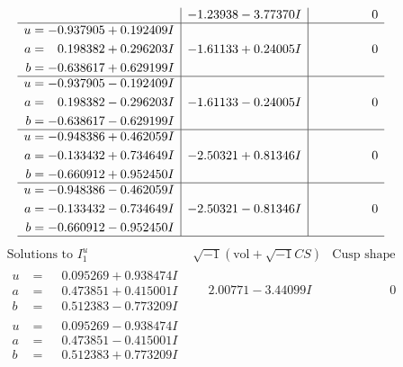 \documentclass[1p]{elsarticle_modified}
\theoremstyle{definition}
\newcommand{\I}{\sqrt{-1}}
\begin{document}
$$\begin{array}{c|c|c}
 & -1.23938 - 3.77370 I & \phantom{-0.000000 } 0 \\ \hline\begin{aligned}
u &= -0.937905 + 0.192409 I \\
a &= \phantom{-}0.198382 + 0.296203 I \\
b &= -0.638617 + 0.629199 I\end{aligned}
 & -1.61133 + 0.24005 I & \phantom{-0.000000 } 0 \\ \hline\begin{aligned}
u &= -0.937905 - 0.192409 I \\
a &= \phantom{-}0.198382 - 0.296203 I \\
b &= -0.638617 - 0.629199 I\end{aligned}
 & -1.61133 - 0.24005 I & \phantom{-0.000000 } 0 \\ \hline\begin{aligned}
u &= -0.948386 + 0.462059 I \\
a &= -0.133432 + 0.734649 I \\
b &= -0.660912 + 0.952450 I\end{aligned}
 & -2.50321 + 0.81346 I & \phantom{-0.000000 } 0 \\ \hline\begin{aligned}
u &= -0.948386 - 0.462059 I \\
a &= -0.133432 - 0.734649 I \\
b &= -0.660912 - 0.952450 I\end{aligned}
 & -2.50321 - 0.81346 I & \phantom{-0.000000 } 0\\
 \hline 
 \end{array}$$\newpage$$\begin{array}{c|c|c}  
\text{Solutions to }I^u_{1}& \I (\text{vol} + \sqrt{-1}CS) & \text{Cusp shape}\\
 \hline 
\begin{aligned}
u &= \phantom{-}0.095269 + 0.938474 I \\
a &= \phantom{-}0.473851 + 0.415001 I \\
b &= \phantom{-}0.512383 - 0.773209 I\end{aligned}
 & \phantom{-}2.00771 - 3.44099 I & \phantom{-0.000000 } 0 \\ \hline\begin{aligned}
u &= \phantom{-}0.095269 - 0.938474 I \\
a &= \phantom{-}0.473851 - 0.415001 I \\
b &= \phantom{-}0.512383 + 0.773209 I\end{aligned}

\end{array}$$
\end{document}

